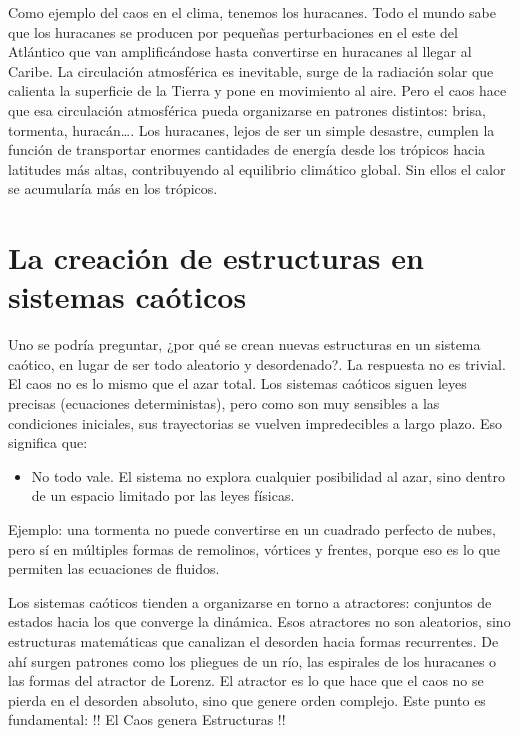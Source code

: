 \documentclass[
  10pt,
  a4paper,
  DIV=11,
  numbers=noendperiod,
  open=any]{scrreprt}
\providecommand{\tightlist}{%
  \setlength{\itemsep}{0pt}\setlength{\parskip}{0pt}}
\numberwithin{equation}{chapter}
\numberwithin{equation}{section}
\renewcommand{\[}{\begin{equation}}
\renewcommand{\]}{\end{equation}}
\begin{document}
Como ejemplo del caos en el clima, tenemos los huracanes. Todo el mundo
sabe que los huracanes se producen por pequeñas perturbaciones en el
este del Atlántico que van amplificándose hasta convertirse en huracanes
al llegar al Caribe. La circulación atmosférica es inevitable, surge de
la radiación solar que calienta la superficie de la Tierra y pone en
movimiento al aire. Pero el caos hace que esa circulación atmosférica
pueda organizarse en patrones distintos: brisa, tormenta, huracán\ldots.
Los huracanes, lejos de ser un simple desastre, cumplen la función de
transportar enormes cantidades de energía desde los trópicos hacia
latitudes más altas, contribuyendo al equilibrio climático global. Sin
ellos el calor se acumularía más en los trópicos.

\section{La creación de estructuras en sistemas
caóticos}\label{la-creaciuxf3n-de-estructuras-en-sistemas-cauxf3ticos}

Uno se podría preguntar, ¿por qué se crean nuevas estructuras en un
sistema caótico, en lugar de ser todo aleatorio y desordenado?. La
respuesta no es trivial. El caos no es lo mismo que el azar total. Los
sistemas caóticos siguen leyes precisas (ecuaciones deterministas), pero
como son muy sensibles a las condiciones iniciales, sus trayectorias se
vuelven impredecibles a largo plazo. Eso significa que:

\begin{itemize}
\tightlist
\item
  No todo vale. El sistema no explora cualquier posibilidad al azar,
  sino dentro de un espacio limitado por las leyes físicas.
\end{itemize}

Ejemplo: una tormenta no puede convertirse en un cuadrado perfecto de
nubes, pero sí en múltiples formas de remolinos, vórtices y frentes,
porque eso es lo que permiten las ecuaciones de fluidos.

Los sistemas caóticos tienden a organizarse en torno a atractores:
conjuntos de estados hacia los que converge la dinámica. Esos atractores
no son aleatorios, sino estructuras matemáticas que canalizan el
desorden hacia formas recurrentes. De ahí surgen patrones como los
pliegues de un río, las espirales de los huracanes o las formas del
atractor de Lorenz. El atractor es lo que hace que el caos no se pierda
en el desorden absoluto, sino que genere orden complejo. Este punto es
fundamental: !! El Caos genera Estructuras !!
\end{document}
